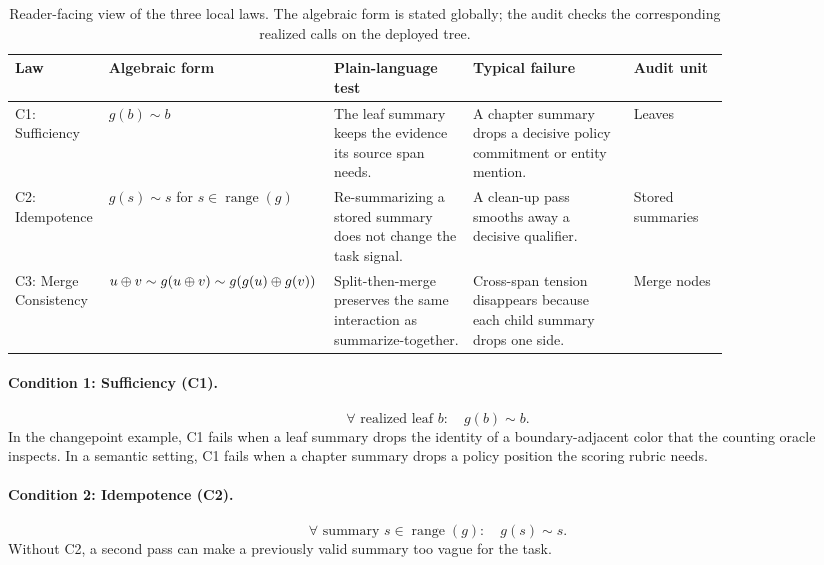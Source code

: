 \begin{table}[t]
\centering\footnotesize
\setlength{\tabcolsep}{3pt}
\begin{tabular}{p{0.11\linewidth}p{0.18\linewidth}p{0.19\linewidth}p{0.22\linewidth}p{0.13\linewidth}}
\toprule
Law & Algebraic form & Plain-language test & Typical failure & Audit unit \\
\midrule
C1: Sufficiency & $g(b)\sim b$ & The leaf summary keeps the evidence its source span needs. & A chapter summary drops a decisive policy commitment or entity mention. & Leaves \\
C2: Idempotence & $g(s)\sim s$ for $s \in \operatorname{range}(g)$ & Re-summarizing a stored summary does not change the task signal. & A clean-up pass smooths away a decisive qualifier. & Stored summaries \\
C3: Merge Consistency & $u \oplus v \sim g(u \oplus v) \sim g(g(u)\oplus g(v))$ & Split-then-merge preserves the same interaction as summarize-together. & Cross-span tension disappears because each child summary drops one side. & Merge nodes \\
\bottomrule
\end{tabular}
\caption{Reader-facing view of the three local laws. The algebraic form is stated globally; the audit checks the corresponding realized calls on the deployed tree.}
\label{tab:law-cards}
\end{table}

\paragraph{Condition 1: Sufficiency (C1).}
\begin{equation}\tag{C1}\label{eq:leaf_sufficiency}
\forall \text{ realized leaf } b:\quad g(b) \sim b.
\end{equation}
In the changepoint example, C1 fails when a leaf summary drops the identity of a boundary-adjacent color that the counting oracle inspects. In a semantic setting, C1 fails when a chapter summary drops a policy position the scoring rubric needs.

\paragraph{Condition 2: Idempotence (C2).}
\begin{equation}\tag{C2}\label{eq:leaf_idempotence}
\forall \text{ summary } s \in \operatorname{range}(g):\quad g(s) \sim s.
\end{equation}
Without C2, a second pass can make a previously valid summary too vague for the task.

